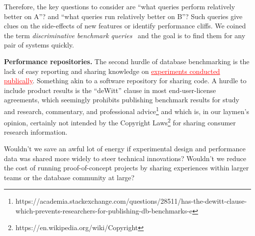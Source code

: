 \documentclass{cidr-2019}
\newcommand{\highlight}[1]{\textcolor{red}{\underline{#1}}}
\begin{document}
Therefore, the key questions to consider are ``what queries perform
relatively better on A''? and ``what queries run relatively better on
B''? Such queries give clues on the side-effects of new features or
identify performance cliffs. We coined the term \textit{discriminative
  benchmark queries}~\cite{DBLP:conf/sigmod/KerstenKZ18} and the goal
is to find them for any pair of systems quickly.


{\bf Performance repositories.}  The second hurdle of database
benchmarking is the lack of easy reporting and sharing knowledge on
\highlight{experiments conducted publically}.
Something akin to a software repository for
sharing code. A hurdle to include product results is the ``deWitt''
clause in most end-user-license agreements, which seemingly prohibits
publishing benchmark results for study and research, commentary, and
professional
advice\footnote{https://academia.stackexchange.com/questions/28511/has-the-dewitt-clause-which-prevents-researchers-for-publishing-db-benchmarks-e}
and which is, in our laymen's opinion, certainly not 
intended by the Copyright Laws\footnote{https://en.wikipedia.org/wiki/Copyright} for sharing consumer research information.

Wouldn't we save an awful lot of energy if experimental design and performance data was
shared more widely to steer technical innovations?  Wouldn't we
reduce the cost of running proof-of-concept projects by 
sharing experiences within larger teams or the database community
at large?

\end{document}
